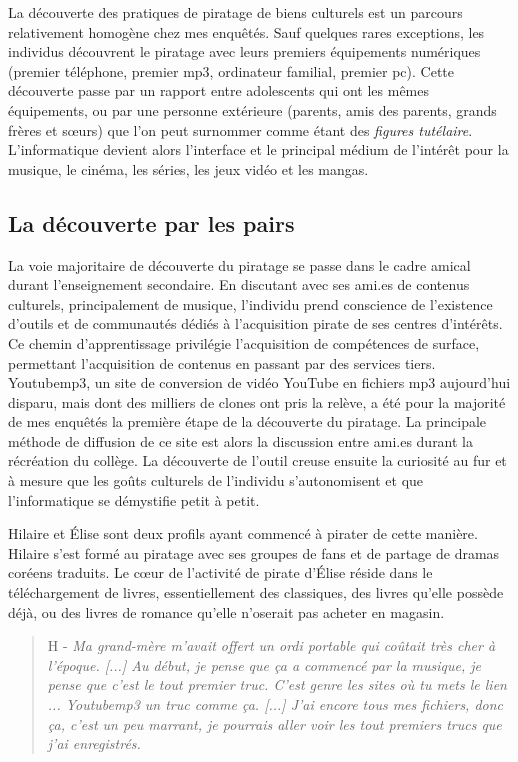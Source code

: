 La découverte des pratiques de piratage de biens culturels est un parcours relativement homogène chez mes enquêtés. Sauf quelques rares exceptions, les individus découvrent le piratage avec leurs premiers équipements numériques (premier téléphone, premier mp3, ordinateur familial, premier pc). Cette découverte passe par un rapport entre adolescents qui ont les mêmes équipements, ou par une personne extérieure (parents, amis des parents, grands frères et sœurs) que l'on peut surnommer comme étant des \textit{figures tutélaire}. L'informatique devient alors l'interface et le principal médium de l'intérêt pour la musique, le cinéma, les séries, les jeux vidéo et les mangas.

\subsection*{La découverte par les pairs}

La voie majoritaire de découverte du piratage se passe dans le cadre amical durant l'enseignement secondaire. En discutant avec ses ami.es de contenus culturels, principalement de musique, l'individu prend conscience de l'existence d'outils et de communautés dédiés à l'acquisition pirate de ses centres d'intérêts. Ce chemin d'apprentissage privilégie l’acquisition de compétences de surface, permettant l'acquisition de contenus en passant par des services tiers. Youtubemp3, un site de conversion de vidéo YouTube en fichiers mp3 aujourd'hui disparu, mais dont des milliers de clones ont pris la relève, a été pour la majorité de mes enquêtés la première étape de la découverte du piratage. La principale méthode de diffusion de ce site est alors la discussion entre ami.es durant la récréation du collège. La découverte de l'outil creuse ensuite la curiosité au fur et à mesure que les goûts culturels de l'individu s'autonomisent et que l'informatique se démystifie petit à petit.

Hilaire et Élise sont deux profils ayant commencé à pirater de cette manière. Hilaire s'est formé au piratage avec ses groupes de fans et de partage de dramas coréens traduits. Le cœur de l'activité de pirate d’Élise réside dans le téléchargement de livres, essentiellement des classiques, des livres qu'elle possède déjà, ou des livres de romance qu'elle n'oserait pas acheter en magasin.

\begin{quote}
H - \textit{Ma grand-mère m'avait offert un ordi portable qui coûtait très cher à l'époque.
 [...] Au début, je pense que ça a commencé par la musique, je pense que c'est le tout premier truc. C'est genre les sites où tu mets le lien ... Youtubemp3 un truc comme ça. [...] J'ai encore tous mes fichiers, donc ça, c'est un peu marrant, je pourrais aller voir les tout premiers trucs que j'ai enregistrés.}
\end{quote}

